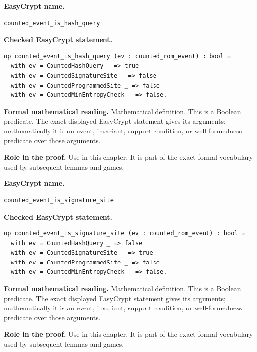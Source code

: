 \begin{formaldefinition}
\noindent\textbf{EasyCrypt name.}
\begin{lstlisting}[language=EasyCrypt,basicstyle=\ttfamily\scriptsize]
counted_event_is_hash_query
\end{lstlisting}
\noindent\textbf{Checked EasyCrypt statement.}
\begin{lstlisting}[language=EasyCrypt,basicstyle=\ttfamily\scriptsize]
op counted_event_is_hash_query (ev : counted_rom_event) : bool =
  with ev = CountedHashQuery _ => true
  with ev = CountedSignatureSite _ => false
  with ev = CountedProgrammedSite _ => false
  with ev = CountedMinEntropyCheck _ => false.
\end{lstlisting}
\noindent\textbf{Formal mathematical reading.}
Mathematical definition. This is a Boolean predicate.  The exact displayed EasyCrypt statement gives its arguments; mathematically it is an event, invariant, support condition, or well-formedness predicate over those arguments.

\noindent\textbf{Role in the proof.}
Use in this chapter. It is part of the exact formal vocabulary used by subsequent lemmas and games.

\end{formaldefinition}

\begin{formaldefinition}
\noindent\textbf{EasyCrypt name.}
\begin{lstlisting}[language=EasyCrypt,basicstyle=\ttfamily\scriptsize]
counted_event_is_signature_site
\end{lstlisting}
\noindent\textbf{Checked EasyCrypt statement.}
\begin{lstlisting}[language=EasyCrypt,basicstyle=\ttfamily\scriptsize]
op counted_event_is_signature_site (ev : counted_rom_event) : bool =
  with ev = CountedHashQuery _ => false
  with ev = CountedSignatureSite _ => true
  with ev = CountedProgrammedSite _ => false
  with ev = CountedMinEntropyCheck _ => false.
\end{lstlisting}
\noindent\textbf{Formal mathematical reading.}
Mathematical definition. This is a Boolean predicate.  The exact displayed EasyCrypt statement gives its arguments; mathematically it is an event, invariant, support condition, or well-formedness predicate over those arguments.

\noindent\textbf{Role in the proof.}
Use in this chapter. It is part of the exact formal vocabulary used by subsequent lemmas and games.

\end{formaldefinition}

